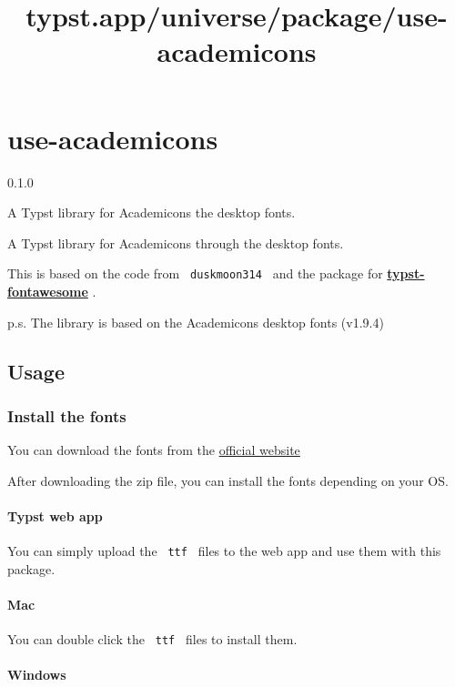 \title{typst.app/universe/package/use-academicons}

\label{banner}
\section{use-academicons}\label{use-academicons}

{ 0.1.0 }

A Typst library for Academicons the desktop fonts.

\label{readme}
A Typst library for Academicons through the desktop fonts.

This is based on the code from \texttt{\ duskmoon314\ } and the package
for
\href{https://github.com/duskmoon314/typst-fontawesome}{\textbf{typst-fontawesome}}
.

p.s. The library is based on the Academicons desktop fonts (v1.9.4)

\subsection{Usage}\label{usage}

\subsubsection{Install the fonts}\label{install-the-fonts}

You can download the fonts from the
\href{https://jpswalsh.github.io/academicons/}{official website}

After downloading the zip file, you can install the fonts depending on
your OS.

\paragraph{Typst web app}\label{typst-web-app}

You can simply upload the \texttt{\ ttf\ } files to the web app and use
them with this package.

\paragraph{Mac}\label{mac}

You can double click the \texttt{\ ttf\ } files to install them.

\paragraph{Windows}\label{windows}


